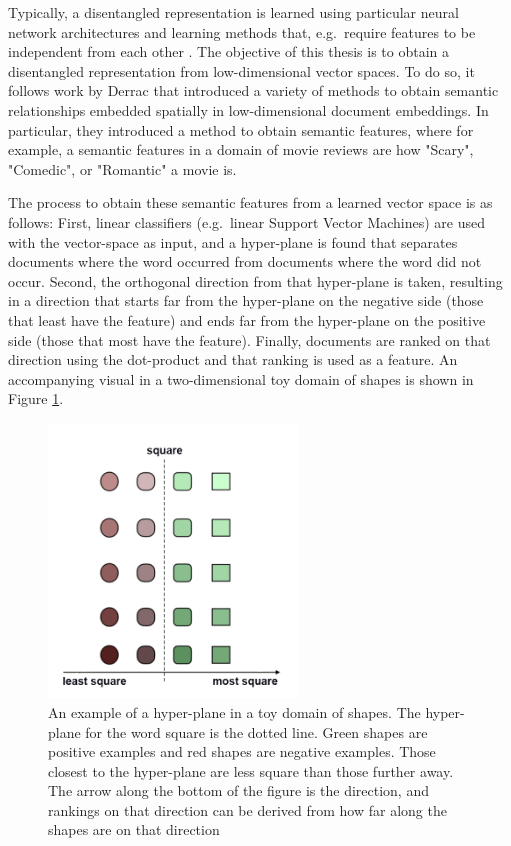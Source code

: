 Typically, a disentangled representation is learned  using particular  neural network architectures and learning methods that, e.g.\ require  features to be independent from each other \cite{Banner}  \cite{Paige2016}. The objective of this thesis is to obtain a disentangled representation from low-dimensional vector spaces. To do so, it follows work by Derrac \cite{Derrac2015} that introduced a variety of methods to obtain semantic relationships embedded spatially in  low-dimensional document embeddings. In particular, they introduced a method to obtain semantic features, where for example, a semantic features in a domain of movie reviews are how "Scary", "Comedic", or "Romantic" a movie is. 

The process to obtain these semantic features  from a learned vector space is as follows: First, linear classifiers (e.g.\ linear Support Vector Machines) are used with the vector-space as input, and a hyper-plane is found that separates documents where the word occurred from documents where the word did not occur. Second, the orthogonal direction from that hyper-plane is taken, resulting in a direction that starts  far from the hyper-plane on the negative side (those that least have the feature) and ends far from the hyper-plane on the positive side (those that most have the feature).  Finally, documents are ranked on that direction using the dot-product and that ranking is used as a feature. An accompanying visual in a two-dimensional toy domain of shapes is shown in Figure \ref{ch1:introhyp}.  %

\begin{figure}[t]
	\includegraphics[width=250px]{images/Toyhyperplane1Direction.png}
	\centering
	\caption{An example of a hyper-plane in a toy domain of shapes. The hyper-plane for the word square is the dotted line. Green shapes are positive examples and red shapes are negative examples. Those closest to the hyper-plane are less square than those further away. The arrow along the bottom of the figure is the direction, and rankings on that direction can be derived from how far along the shapes are on that direction}\label{ch1:introhyp}
\end{figure}

